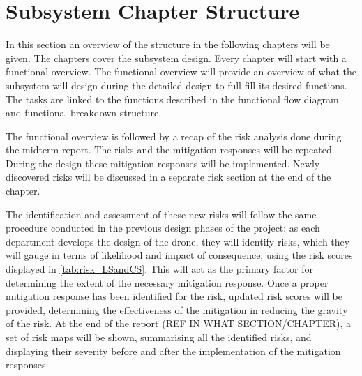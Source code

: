 \section{Subsystem Chapter Structure} \label{SDA:chapterstructure}
In this section an overview of the structure in the following chapters will be given. The chapters cover the subsystem design.
Every chapter will start with a functional overview. The functional overview will provide an overview of what the subsystem will design during the detailed design to full fill its desired functions. The tasks are linked to the functions described in the functional flow diagram and functional breakdown structure.

The functional overview is followed by a recap of the risk analysis done during the midterm report\cite{midterm}. The risks and the mitigation responses will be repeated. During the design these mitigation responses will be implemented. Newly discovered risks will be discussed in a separate risk section at the end of the chapter.


The identification and assessment of these new risks will follow the same procedure conducted in the previous design phases of the project: as each department develops the design of the drone, they will identify risks, which they will gauge in terms of likelihood and impact of consequence, using the risk scores displayed in \autoref{tab:risk_LSandCS}. This will act as the primary factor for determining the extent of the necessary mitigation response. Once a proper mitigation response has been identified for the risk, updated risk scores will be provided, determining the effectiveness of the mitigation in reducing the gravity of the risk. At the end of the report (REF IN WHAT SECTION/CHAPTER), a set of risk maps will be shown, summarising all the identified risks, and displaying their severity before and after the implementation of the mitigation responses.

